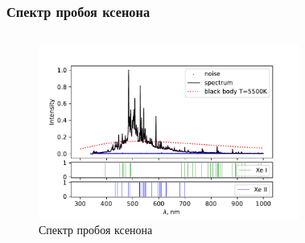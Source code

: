 \documentclass{beamer}
\begin{document}
	\begin{frame}
		\frametitle{Спектр пробоя ксенона}
		\begin{columns}
			\begin{figure}
				\centering
				\includegraphics[width=1.1\linewidth]{gen/tirat_xe_lines.pdf}
				\caption*{Спектр пробоя ксенона}
			\end{figure}	
			\begin{figure}
				\centering

\end{figure}
\end{columns}
\end{frame}
\end{document}
